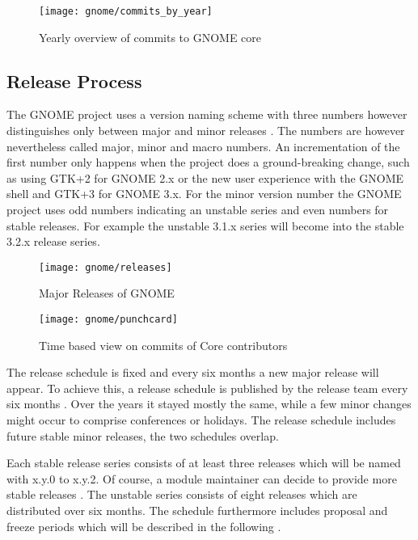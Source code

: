 \begin{figure}[htbp]
  \centering
  \texttt{[image: gnome/commits\_by\_year]}
  \caption{Yearly overview of commits to GNOME core}
\end{figure}


\subsection{Release Process} %
\label{sub:Release Process}

The GNOME project uses a version naming scheme with three numbers however
distinguishes only between major and minor releases
\cite{GNOMEDevelopmentSchedule,GNOMESchedule}. The numbers are however
nevertheless called major, minor and macro numbers. An incrementation of the
first number only happens when the project does a ground-breaking change, such
as using GTK+2 for GNOME 2.x or the new user experience with the GNOME shell
and GTK+3 for GNOME 3.x. For the minor version number the GNOME project uses
odd numbers indicating an unstable series and even numbers for stable releases.
For example the unstable 3.1.x series will become into the stable 3.2.x release
series.

\begin{figure}[htbp]
  \centering
  \texttt{[image: gnome/releases]}
  \caption{Major Releases of GNOME}
\end{figure}

\begin{figure}[htbp]
  \centering
  \texttt{[image: gnome/punchcard]}
  \caption{Time based view on commits of Core contributors}
\end{figure}

The release schedule is fixed and every six months a new major release will
appear. To achieve this, a release schedule is published by the release team
every six months \cite{GNOMEDevelopmentSchedule}. Over the years it stayed
mostly the same, while a few minor changes might occur to comprise conferences
or holidays. The release schedule includes future stable minor releases, the
two schedules overlap.

Each stable release series consists of at least three releases which will be
named with x.y.0 to x.y.2. Of course, a module maintainer can decide to provide
more stable releases \cite{GNOMEReleaseTeam}. The unstable series consists of
eight releases which are distributed over six months. The schedule furthermore
includes proposal and freeze periods which will be described in the following
\cite{GNOMEDevelopmentSchedule,GNOMESchedule}.

